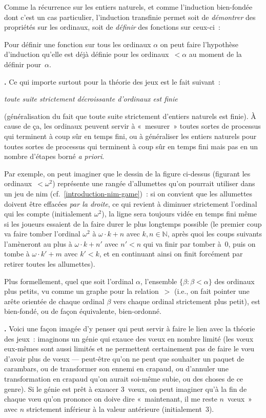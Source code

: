 \documentclass[12pt,a4paper]{article}
\theoremstyle{definition}
\newcommand\thingy{%
\refstepcounter{comcnt}\smallskip\noindent\textbf{\thecomcnt.} }
\begin{document}
Comme la récurrence sur les entiers naturels, et comme l'induction
bien-fondée dont c'est un cas particulier, l'induction transfinie
permet soit de \emph{démontrer} des propriétés sur les ordinaux, soit
de \emph{définir} des fonctions sur ceux-ci :
\begin{center}
Pour définir une fonction sur tous les ordinaux $\alpha$ on peut faire
l'hypothèse d'induction qu'elle est déjà définie pour les
ordinaux $<\alpha$ au moment de la définir pour $\alpha$.
\end{center}

\thingy\label{decreasing-sequences-of-ordinals-terminate}
Ce qui importe surtout pour la théorie des jeux est le fait suivant :
\begin{center}
\emph{toute suite strictement décroissante d'ordinaux est finie}
\end{center}
(généralisation du fait que toute suite strictement d'entiers naturels
est finie).  À cause de ça, les ordinaux peuvent servir à « mesurer »
toutes sortes de processus qui terminent à coup sûr en temps fini, ou
à généraliser les entiers naturels pour toutes sortes de processus qui
terminent à coup sûr en temps fini mais pas en un nombre d'étapes
borné \textit{a priori}.

Par exemple, on peut imaginer que le dessin de la figure ci-dessus
(figurant les ordinaux $<\omega^2$) représente une rangée d'allumettes
qu'on pourrait utiliser dans un jeu de nim
(cf. \ref{introduction-nim-game}) : si on convient que les allumettes
doivent être effacées \emph{par la droite}, ce qui revient à diminuer
strictement l'ordinal qui les compte (initialement $\omega^2$), la
ligne sera toujours vidée en temps fini même si les joueurs essaient
de la faire durer le plus longtemps possible (le premier coup va faire
tomber l'ordinal $\omega^2$ à $\omega\cdot k + n$ avec
$k,n\in\mathbb{N}$, après quoi les coups suivants l'amèneront au plus
à $\omega\cdot k + n'$ avec $n'<n$ qui va finir par tomber à $0$, puis
on tombe à $\omega\cdot k' + m$ avec $k'<k$, et en continuant ainsi on
finit forcément par retirer toutes les allumettes).

Plus formellement, quel que soit l'ordinal $\alpha$, l'ensemble
$\{\beta : \beta<\alpha\}$ des ordinaux plus petits, vu comme un
graphe pour la relation $>$ (i.e., on fait pointer une arête orientée
de chaque ordinal $\beta$ vers chaque ordinal strictement plus petit),
est bien-fondé, ou de façon équivalente, bien-ordonné.

\thingy\label{ordinal-counting-genies-story}
Voici une façon imagée d'y penser qui peut servir à faire le
lien avec la théorie des jeux : imaginons un génie qui exauce des vœux
en nombre limité (les vœux eux-mêmes sont aussi limités et ne
permettent certainement pas de faire le vœu d'avoir plus de vœux —
peut-être qu'on ne peut que souhaiter un paquet de carambars, ou de
transformer son ennemi en crapaud, ou d'annuler une transformation en
crapaud qu'on aurait soi-même subie, ou des choses de ce genre).  Si
le génie est prêt à exaucer $3$ vœux, on peut imaginer qu'à la fin de
chaque vœu qu'on prononce on doive dire « maintenant, il me reste
$n$ vœux » avec $n$ strictement inférieur à la valeur antérieure
(initialement $3$).
\end{document}
